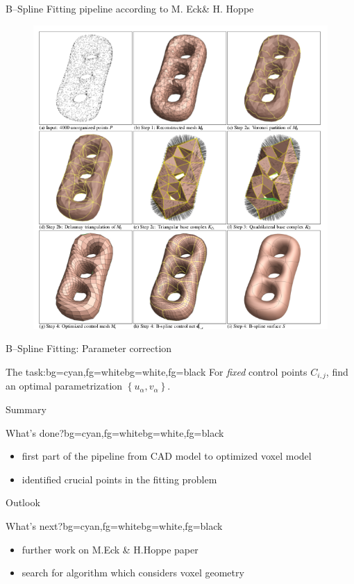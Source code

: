 \begin{frame}{B--Spline Fitting pipeline according to M. Eck\& H. Hoppe}
\begin{figure}
\includegraphics[width=0.625\linewidth]{Pictures/HoppePipeline.png}
\end{figure}
\end{frame}

\begin{frame}{B--Spline Fitting: Parameter correction}
\begin{variableblock}{The task:}{bg=cyan,fg=white}{bg=white,fg=black}
{
For \textit{fixed} control points $C_{i,j}$, find an optimal parametrization $\left\lbrace u_\alpha,v_\alpha \right\rbrace$.
}
\end{variableblock}

\end{frame}

\begin{frame}{Summary}
\begin{variableblock}{What's done?}{bg=cyan,fg=white}{bg=white,fg=black}
{
\begin{itemize}
\item first part of the pipeline from CAD model to optimized voxel model
\item identified crucial points in the fitting problem
\end{itemize}
}
\end{variableblock}
\end{frame}

\begin{frame}{Outlook}
\begin{variableblock}{What's next?}{bg=cyan,fg=white}{bg=white,fg=black}
{
\begin{itemize}
\item further work on M.Eck \& H.Hoppe paper
\item search for algorithm which considers voxel geometry
\end{itemize}
}
\end{variableblock}
\end{frame}